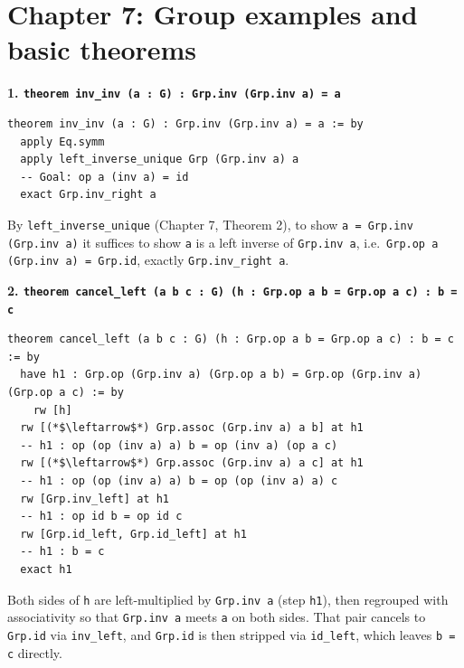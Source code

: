 \section{Chapter 7: Group examples and basic theorems}\label{sec:14-appendix-solutions:06-chapter-7:1}

\textbf{1. \texttt{theorem inv\_\allowbreak{}inv (a : G) : Grp.inv (Grp.inv a) = a}}

\begin{lstlisting}
theorem inv_inv (a : G) : Grp.inv (Grp.inv a) = a := by
  apply Eq.symm
  apply left_inverse_unique Grp (Grp.inv a) a
  -- Goal: op a (inv a) = id
  exact Grp.inv_right a
\end{lstlisting}

By \texttt{left\_\allowbreak{}inverse\_\allowbreak{}unique} (Chapter 7, Theorem 2), to show \texttt{a = Grp.inv (Grp.inv a)} it suffices to show \texttt{a} is a left inverse of \texttt{Grp.inv a}, i.e.~\texttt{Grp.op a (Grp.inv a) = Grp.id}, exactly \texttt{Grp.inv\_\allowbreak{}right a}.

\textbf{2. \texttt{theorem cancel\_\allowbreak{}left (a b c : G) (h : Grp.op a b = Grp.op a c) : b = c}}

\begin{lstlisting}
theorem cancel_left (a b c : G) (h : Grp.op a b = Grp.op a c) : b = c := by
  have h1 : Grp.op (Grp.inv a) (Grp.op a b) = Grp.op (Grp.inv a) (Grp.op a c) := by
    rw [h]
  rw [(*$\leftarrow$*) Grp.assoc (Grp.inv a) a b] at h1
  -- h1 : op (op (inv a) a) b = op (inv a) (op a c)
  rw [(*$\leftarrow$*) Grp.assoc (Grp.inv a) a c] at h1
  -- h1 : op (op (inv a) a) b = op (op (inv a) a) c
  rw [Grp.inv_left] at h1
  -- h1 : op id b = op id c
  rw [Grp.id_left, Grp.id_left] at h1
  -- h1 : b = c
  exact h1
\end{lstlisting}

Both sides of \texttt{h} are left-multiplied by \texttt{Grp.inv a} (step \texttt{h1}), then regrouped with associativity so that \texttt{Grp.inv a} meets \texttt{a} on both sides. That pair cancels to \texttt{Grp.id} via \texttt{inv\_\allowbreak{}left}, and \texttt{Grp.id} is then stripped via \texttt{id\_\allowbreak{}left}, which leaves \texttt{b = c} directly.

